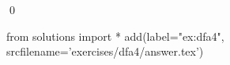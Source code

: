 
\begin{ex} 
  \label{ex:dfa4}
  
  \qed
\end{ex} 
\begin{python0}
from solutions import *
add(label="ex:dfa4",
    srcfilename='exercises/dfa4/answer.tex') 
\end{python0}
